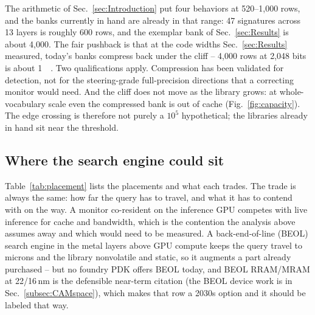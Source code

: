 The arithmetic of Sec.~\ref{sec:Introduction} put four behaviors at
520--1{,}000 rows, and the banks currently in hand are already in that
range: 47 signatures across 13 layers is roughly 600 rows, and the
exemplar bank of Sec.~\ref{sec:Results} is about 4{,}000. The fair
pushback is that at the code widths Sec.~\ref{sec:Results} measured,
today's banks compress back under the cliff -- 4{,}000 rows at 2{,}048
bits is about \qty{1}{\mega\byte}. Two qualifications apply. Compression has been validated for detection, not for the
steering-grade full-precision directions that a correcting monitor would
need. And the cliff does not move as the library grows: at
whole-vocabulary scale even the compressed bank is out of cache
(Fig.~\ref{fig:capacity}). The edge crossing is therefore not purely a
$10^{5}$ hypothetical; the libraries already in hand sit near the
threshold.

\subsection{Where the search engine could sit}
\label{subsec:Placement}
Table~\ref{tab:placement} lists the placements and what each trades. The
trade is always the same: how far the query has to travel, and what it
has to contend with on the way. A monitor co-resident on the inference
GPU competes with live inference for cache and bandwidth, which is the
contention the analysis above assumes away and which would need to be
measured. A back-end-of-line (BEOL) search engine in the metal layers
above GPU compute keeps the query travel to microns and the library
nonvolatile and static, so it augments a part already purchased -- but no
foundry PDK offers BEOL \fefet today, and BEOL RRAM/MRAM at 22/16\,nm is
the defensible near-term citation
(the BEOL device work is in Sec.~\ref{subsec:CAMspace}), which makes
that row a 2030s option and it should be labeled that way.

